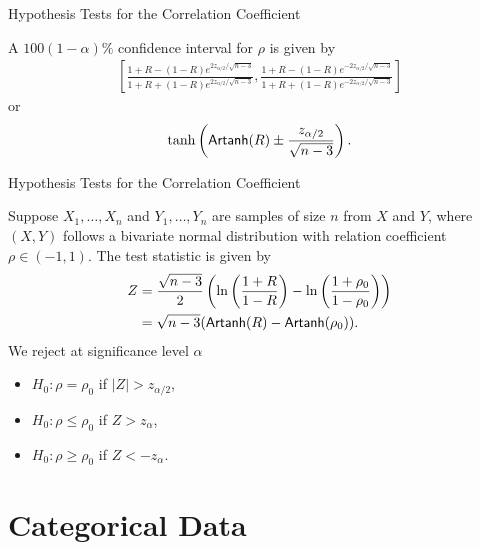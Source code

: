 \begin{frame}{Hypothesis Tests for the Correlation Coefficient}

\justifying
{} A $100(1-\alpha)\%$ confidence interval for $\rho$ is given by
\begin{align*}
\left[\frac{1+R-(1-R)e^{2z_{\alpha/2}/\sqrt{n-3}}}{1+R+(1-R)e^{2z_{\alpha/2}/\sqrt{n-3}}},  \frac{1+R-(1-R)e^{-2z_{\alpha/2}/\sqrt{n-3}}}{1+R+(1-R)e^{-2z_{\alpha/2}/\sqrt{n-3}}}\right]
\end{align*}
or
\begin{align*}
\tanh\left(\mathsf{Artanh}(R) \pm \frac{z_{\alpha/2}}{\sqrt{n-3}} \right).
\end{align*}


\end{frame}


\begin{frame}{Hypothesis Tests for the Correlation Coefficient}

\justifying
Suppose $X_1, \ldots, X_n$ and $Y_1, \ldots, Y_n$ are samples of size $n$ from $X$ and $Y$, where $(X, Y)$ follows a bivariate normal distribution with relation coefficient $\rho\in (-1, 1)$. The test statistic is given by
\begin{align*}
Z & = \frac{\sqrt{n-3}}{2}\left(\ln\left(\frac{1+R}{1-R} \right) - \ln\left(\frac{1+\rho_0}{1-\rho_0} \right) \right) \\
& = \sqrt{n-3}(\mathsf{Artanh}(R) - \mathsf{Artanh}(\rho_0)).
\end{align*}
We reject at significance level $\alpha$
\begin{itemize}
	\item $H_0: \rho = \rho_0$ if $|Z| > z_{\alpha/2}$,
	\item $H_0: \rho \leq \rho_0$ if $Z > z_{\alpha}$,
	\item $H_0: \rho \geq \rho_0$ if $Z < -z_{\alpha}$.
\end{itemize}


\end{frame}


\section{Categorical Data}





